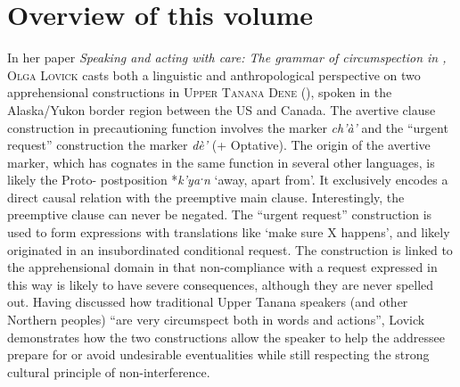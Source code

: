 \documentclass[output=paper,colorlinks,citecolor=brown]{langscibook}
\begin{document}
\section{Overview of this volume}
\label{sec:summaries}

In her paper \textit{Speaking and acting with care: The grammar of circumspection in ,} \textsc{Olga} \textsc{Lovick} casts both a linguistic and anthropological perspective on two apprehensional constructions in \textsc{Upper} \textsc{Tanana} \textsc{Dene} (), spoken in the Alaska/Yukon border region between the US and Canada. The avertive clause construction in precautioning function involves the marker \textit{ch'à'} and the ``urgent request'' construction the marker \textit{dè'} (+ Optative). The origin of the avertive marker, which has cognates in the same function in several other  languages, is likely the Proto- postposition *\textit{k'yaˑn} `away, apart from'. It exclusively encodes a direct causal relation with the preemptive main clause. Interestingly, the preemptive clause can never be negated. The ``urgent request'' construction is used to form expressions with translations like `make sure X happens', and likely originated in an insubordinated conditional request. The construction is linked to the apprehensional domain in that non-compliance with a request expressed in this way is likely to have severe  consequences, although they are never spelled out. Having discussed how traditional Upper Tanana speakers (and other Northern  peoples) ``are very circumspect both in words and actions'', Lovick demonstrates how the two constructions allow the speaker to help the addressee prepare for or avoid undesirable eventualities while still respecting the strong cultural principle of non-interference.
\end{document}
